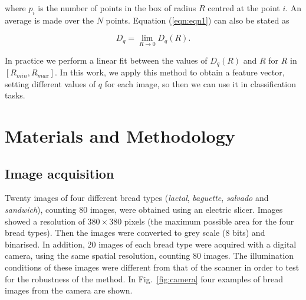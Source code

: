 \documentclass[oneside,a4paper,english,links]{article}
\begin{document}
where $p_{i}$ is the number of points in the box of radius $R$ centred at the point $i$. An average is made over the $N$ points. Equation (\ref{eqn:eqn1}) can also be stated as

\begin{equation}
D_{q} = \lim_{R\rightarrow0}{D_{q}(R)}.
\end{equation}

In practice we perform a linear fit between the values of $D_{q}(R)$ and $R$ for $R$ in $[R_{min}, R_{max}]$. In this work, we apply this method to obtain a feature vector, setting different values of $q$ for each image, so then we can use it in classification tasks.

\section{Materials and Methodology}

\subsection{Image acquisition}
Twenty images of four different bread types ({\em lactal}, {\em baguette}, {\em salvado} and {\em sandwich}), counting $80$ images, were obtained using an electric slicer. Images showed a resolution of $380 \times 380$ pixels (the maximum possible area for the four bread types). Then the images were converted to grey scale ($8$ bits) and binarised. In addition, $20$ images of each bread type were acquired with a digital camera, using the same spatial resolution, counting $80$ images. The illumination conditions of these images were different from that of the scanner in order to test for the robustness of the method. In Fig.~\ref{fig:camera} four examples of bread images from the camera are shown. 
\end{document}
